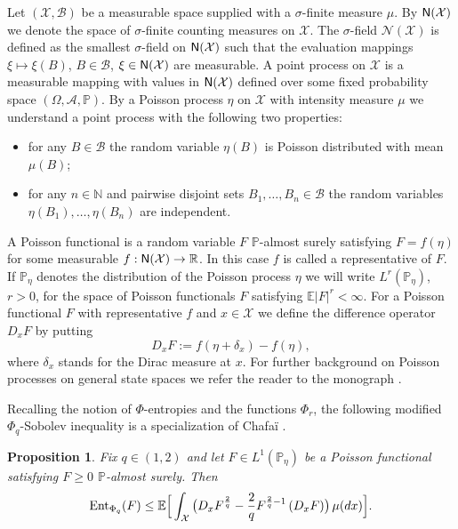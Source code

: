 \documentclass[a4paper,12pt]{amsart}
\numberwithin{equation}{section}
\newtheorem{proposition}[satz]{Proposition}
\theoremstyle{remark}
\def\E{{\mathbb E}}
\def\P{{\mathbb P}}
\def\R{{\mathbb R}}
\def\N{{\mathbb N}}
\def\Ent{{\mathrm{Ent}}}
\newcommand{\PP}{\mathbb{P}}
\def\cN{\mathcal{N}}
\def\sfN{{\sf N}}
\begin{document}
Let $(\mathcal{X}, \mathcal{B})$ be a measurable space supplied with a $\sigma$-finite measure $\mu$. By $\sfN(\mathcal{X})$ we denote the space of $\sigma$-finite counting measures on $\mathcal{X}$. The $\sigma$-field $\cN(\mathcal{X})$ is defined as the smallest $\sigma$-field on $\sfN(\mathcal{X})$ such that the evaluation mappings $\xi\mapsto\xi(B)$, $B\in\mathcal{B}$, $\xi\in\sfN(\mathcal{X})$ are measurable. A point process on $\mathcal{X}$ is a measurable mapping with values in $\sfN(\mathcal{X})$ defined over some fixed probability space $(\Omega,\mathcal{A},\P)$. By a Poisson process $\eta$ on $\mathcal{X}$ with intensity measure $\mu$ we understand a point process with the following two properties:
\begin{itemize}
    \item[(i)] for any $B\in\mathcal{B}$ the random variable $\eta(B)$ is Poisson distributed with mean $\mu(B)$;
    \item[(ii)] for any $n\in\N$ and pairwise disjoint sets $B_1,\ldots,B_n\in\mathcal{B}$ the random variables $\eta(B_1),\ldots,\eta(B_n)$ are independent.
\end{itemize}

A Poisson functional is a random variable $F$ $\PP$-almost surely satisfying $F=f(\eta)$ for some measurable $f:\sfN(\mathcal{X})\to\R$. In this case $f$ is called a representative of $F$. If $\PP_\eta$ denotes the distribution of the Poisson process $\eta$ we will write $L^r(\PP_\eta)$, $r> 0$, for the space of Poisson functionals $F$ satisfying $\E|F|^r<\infty$. For a Poisson functional $F$ with representative $f$ and $x\in\mathcal{X}$ we define the difference operator $D_xF$ by putting
$$
D_xF:=f(\eta+\delta_x)-f(\eta),
$$
where $\delta_x$ stands for the Dirac measure at $x$. For further background on Poisson processes on general state spaces we refer the reader to the monograph \cite{LP17}.

Recalling the notion of $\Phi$-entropies and the functions $\Phi_r$, the following modified $\Phi_q$-Sobolev inequality is a specialization of Chafa\"{i} \cite[Sec.\ 5.1]{Cha04}.

\begin{proposition}\label{prop:PhiRSovolev}
Fix $q\in(1,2)$ and let $F\in L^1(\PP_\eta)$ be a Poisson functional satisfying $F\geq 0$ $\PP$-almost surely. Then
$$
\Ent_{\Phi_q}(F) \leq \E\Big[\int_\mathcal{X}\big(D_xF^{2\over q}-{2\over q}F^{{2\over q}-1}\,(D_xF)\big)\,\mu(d x)\Big].
$$
\end{proposition}
\end{document}
